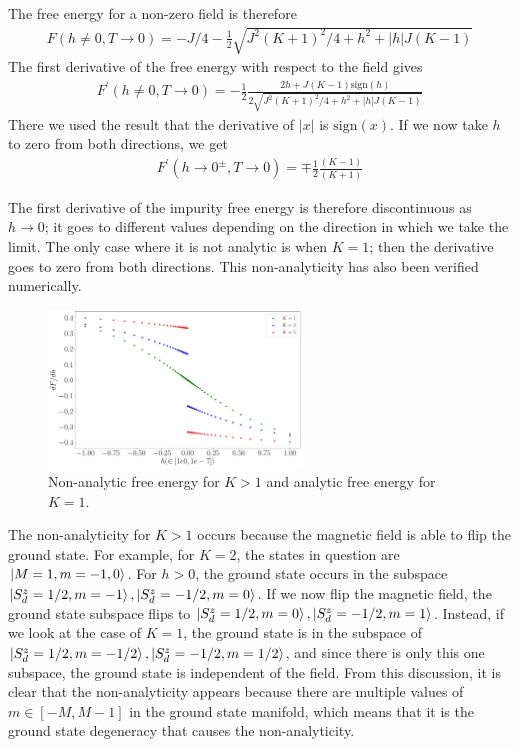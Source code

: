 \documentclass[12pt]{revtex4-2}
\begin{document}
The free energy for a non-zero field is therefore
\begin{equation}\begin{aligned}
	F(h\neq 0, T\to 0) = -J/4 - \frac{1}{2}\sqrt{J^2(K+1)^2/4 + h^2 + |h|J(K-1)}
\end{aligned}\end{equation}
The first derivative of the free energy with respect to the field gives
\begin{equation}\begin{aligned}
	F^\prime(h\neq 0, T\to 0) =- \frac{1}{2}\frac{2h + J(K-1)\text{sign}(h)}{2\sqrt{J^2(K+1)^2/4 + h^2 + |h|J(K-1)}}
\end{aligned}\end{equation}
There we used the result that the derivative of \(|x|\) is \(\text{sign}(x)\). If we now take \(h\) to zero from both directions, we get
\begin{equation}\begin{aligned}
	F^\prime(h \to 0^\pm, T\to 0) = \mp \frac{1}{2}\frac{(K-1)}{(K+1)}
\end{aligned}\end{equation}

The first derivative of the impurity free energy is therefore discontinuous as \(h\to 0\); it goes to different values depending on the direction in which we take the limit. The only case where it is not analytic is when \(K=1\); then the derivative goes to zero from both directions. This non-analyticity has also been verified numerically.
\begin{figure}[htpb]
	\centering
	\includegraphics[width=0.6\textwidth]{../numerics/disc_mag_imp.pdf}
	\caption{Non-analytic free energy for \(K>1\) and analytic free energy for \(K=1\).}
\end{figure}

The non-analyticity for \(K>1\) occurs because the magnetic field is able to flip the ground state. For example, for \(K=2\), the states in question are \(\ket{M=1, m=-1,0}\). For \(h>0\), the ground state occurs in the subspace \(\ket{S_d^z=1/2, m=-1},\ket{S_d^z=-1/2,m=0}\). If we now flip the magnetic field, the ground state subspace flips to \(\ket{S_d^z=1/2, m=0},\ket{S_d^z=-1/2,m=1}\). Instead, if we look at the case of \(K=1\), the ground state is in the subspace of \(\ket{S_d^z=1/2,m=-1/2},\ket{S_d^z=-1/2, m=1/2}\), and since there is only this one subspace, the ground state is independent of the field. From this discussion, it is clear that the non-analyticity appears because there are multiple values of \(m \in [-M, M-1]\) in the ground state manifold, which means that it is the ground state degeneracy that causes the non-analyticity.
\end{document}
